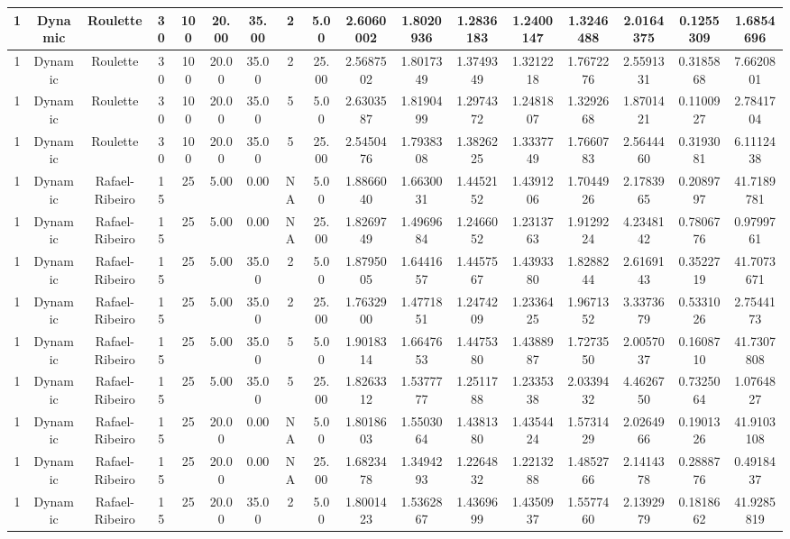 \begin{longtable}{ | c | c | c | c | c | c | c | c | c | c | c | c | c | c | c | c | c | }
	\hline
	1	&	Dynamic	&	Roulette	&	30	&	100	&	20.00	&	35.00	&	2	&	5.00	&	2.6060002	&	1.8020936	&	1.2836183	&	1.2400147	&	1.3246488	&	2.0164375	&	0.1255309	&	1.6854696 \\
	\hline
	1	&	Dynamic	&	Roulette	&	30	&	100	&	20.00	&	35.00	&	2	&	25.00	&	2.5687502	&	1.8017349	&	1.3749349	&	1.3212218	&	1.7672276	&	2.5591331	&	0.3185868	&	7.6620801 \\
	\hline
	1	&	Dynamic	&	Roulette	&	30	&	100	&	20.00	&	35.00	&	5	&	5.00	&	2.6303587	&	1.8190499	&	1.2974372	&	1.2481807	&	1.3292668	&	1.8701421	&	0.1100927	&	2.7841704 \\
	\hline
	1	&	Dynamic	&	Roulette	&	30	&	100	&	20.00	&	35.00	&	5	&	25.00	&	2.5450476	&	1.7938308	&	1.3826225	&	1.3337749	&	1.7660783	&	2.5644460	&	0.3193081	&	6.1112438 \\
	\hline
	1	&	Dynamic	&	Rafael-Ribeiro	&	15	&	25	&	5.00	&	0.00	&	NA	&	5.00	&	1.8866040	&	1.6630031	&	1.4452152	&	1.4391206	&	1.7044926	&	2.1783965	&	0.2089797	&	41.7189781 \\
	\hline
	1	&	Dynamic	&	Rafael-Ribeiro	&	15	&	25	&	5.00	&	0.00	&	NA	&	25.00	&	1.8269749	&	1.4969684	&	1.2466052	&	1.2313763	&	1.9129224	&	4.2348142	&	0.7806776	&	0.9799761 \\
	\hline
	1	&	Dynamic	&	Rafael-Ribeiro	&	15	&	25	&	5.00	&	35.00	&	2	&	5.00	&	1.8795005	&	1.6441657	&	1.4457567	&	1.4393380	&	1.8288244	&	2.6169143	&	0.3522719	&	41.7073671 \\
	\hline
	1	&	Dynamic	&	Rafael-Ribeiro	&	15	&	25	&	5.00	&	35.00	&	2	&	25.00	&	1.7632900	&	1.4771851	&	1.2474209	&	1.2336425	&	1.9671352	&	3.3373679	&	0.5331026	&	2.7544173 \\
	\hline
	1	&	Dynamic	&	Rafael-Ribeiro	&	15	&	25	&	5.00	&	35.00	&	5	&	5.00	&	1.9018314	&	1.6647653	&	1.4475380	&	1.4388987	&	1.7273550	&	2.0057037	&	0.1608710	&	41.7307808 \\
	\hline
	1	&	Dynamic	&	Rafael-Ribeiro	&	15	&	25	&	5.00	&	35.00	&	5	&	25.00	&	1.8263312	&	1.5377777	&	1.2511788	&	1.2335338	&	2.0339432	&	4.4626750	&	0.7325064	&	1.0764827 \\
	\hline
	1	&	Dynamic	&	Rafael-Ribeiro	&	15	&	25	&	20.00	&	0.00	&	NA	&	5.00	&	1.8018603	&	1.5503064	&	1.4381380	&	1.4354424	&	1.5731429	&	2.0264966	&	0.1901326	&	41.9103108 \\
	\hline
	1	&	Dynamic	&	Rafael-Ribeiro	&	15	&	25	&	20.00	&	0.00	&	NA	&	25.00	&	1.6823478	&	1.3494293	&	1.2264832	&	1.2213288	&	1.4852766	&	2.1414378	&	0.2888776	&	0.4918437 \\
	\hline
	1	&	Dynamic	&	Rafael-Ribeiro	&	15	&	25	&	20.00	&	35.00	&	2	&	5.00	&	1.8001423	&	1.5362867	&	1.4369699	&	1.4350937	&	1.5577460	&	2.1392979	&	0.1818662	&	41.9285819 \\

\end{longtable}
